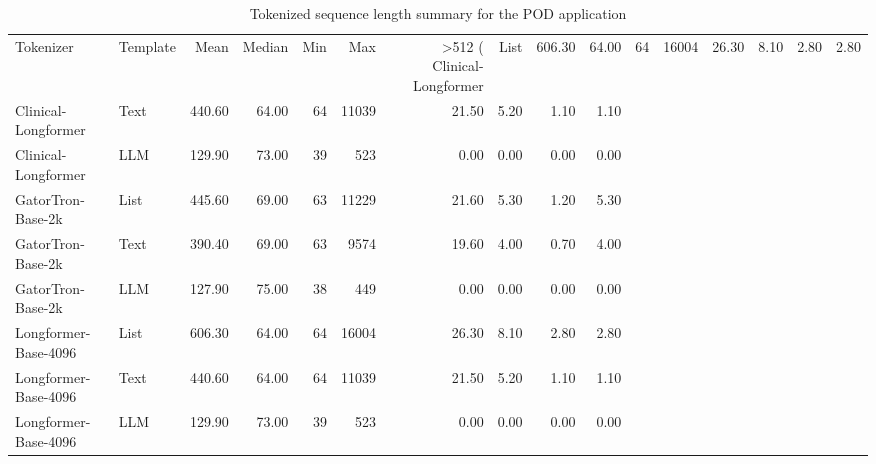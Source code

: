 \begin{table}
\caption{Tokenized sequence length summary for the POD application}
\label{tab:token_lengths}
\begin{tabular}{llrrrrrrrr}
\toprule
Tokenizer & Template & Mean & Median & Min & Max & >512 (%
\midrule
Clinical-Longformer & List & 606.30 & 64.00 & 64 & 16004 & 26.30 & 8.10 & 2.80 & 2.80 \\
Clinical-Longformer & Text & 440.60 & 64.00 & 64 & 11039 & 21.50 & 5.20 & 1.10 & 1.10 \\
Clinical-Longformer & LLM & 129.90 & 73.00 & 39 & 523 & 0.00 & 0.00 & 0.00 & 0.00 \\
GatorTron-Base-2k & List & 445.60 & 69.00 & 63 & 11229 & 21.60 & 5.30 & 1.20 & 5.30 \\
GatorTron-Base-2k & Text & 390.40 & 69.00 & 63 & 9574 & 19.60 & 4.00 & 0.70 & 4.00 \\
GatorTron-Base-2k & LLM & 127.90 & 75.00 & 38 & 449 & 0.00 & 0.00 & 0.00 & 0.00 \\
Longformer-Base-4096 & List & 606.30 & 64.00 & 64 & 16004 & 26.30 & 8.10 & 2.80 & 2.80 \\
Longformer-Base-4096 & Text & 440.60 & 64.00 & 64 & 11039 & 21.50 & 5.20 & 1.10 & 1.10 \\
Longformer-Base-4096 & LLM & 129.90 & 73.00 & 39 & 523 & 0.00 & 0.00 & 0.00 & 0.00 \\
\bottomrule
\end{tabular}
\end{table}
